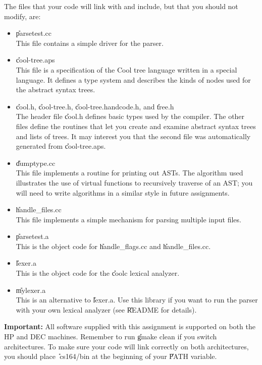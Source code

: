 The files that your code will link with and include, but that you should
not modify, are:
\begin{itemize}
\item \U{parsetest.cc} \\
This file contains a simple driver for the parser.

\item \U{cool-tree.aps} \\
This file is a specification of the Cool tree language written in
a special language.  It defines a type system and describes the kinds
of nodes used for the abstract syntax trees.

\item \U{cool.h}, \U{cool-tree.h}, \U{cool-tree.handcode.h}, and \U{tree.h} \\
The header file \U{cool.h} defines basic types used by the compiler.
The other files define the routines that let you create and examine
abstract syntax trees and lists of trees.
It may interest you that the second file was automatically generated from
\U{cool-tree.aps}.

\item \U{dumptype.cc} \\
This file implements a routine for printing out ASTs.  The algorithm used
illustrates the  use of virtual functions to recursively traverse of an AST; you will need to write algorithms in a similar style in future assignments.

\item \U{handle\_files.cc} \\
This file implements a simple mechanism for parsing multiple input files.

\item \U{parsetest.a} \\
This is the object code for \U{handle\_flags.cc} and \U{handle\_files.cc}.

\item \U{lexer.a} \\
This is the object code for the \U{coolc} lexical analyzer.

\item \U{mylexer.a} \\
This is an alternative to \U{lexer.a}.  Use this library if you
want to run the parser with your own lexical analyzer (see \U{README}
for details).
 
\end{itemize}%

{\bf Important:} All software supplied with this assignment is supported on both
the HP and DEC machines.  Remember to run \U{gmake clean} if you switch
architectures.  To make sure your code will link correctly on both architectures,
you should place \U{~cs164/bin} at the beginning of your \U{PATH} variable.

